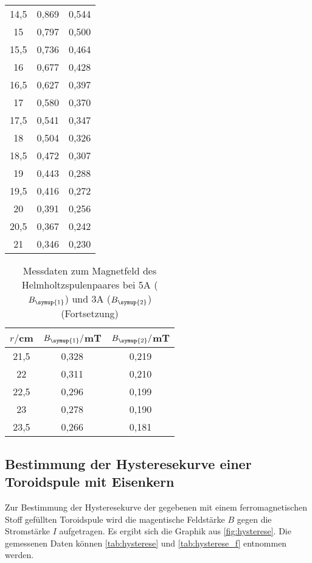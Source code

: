 \begin{table}
\begin{tabular}{c c c}
    14,5	&  0,869 & 0,544\\
    15	  &  0,797 & 0,500\\
    15,5	&  0,736 & 0,464\\
    16	  &  0,677 & 0,428\\
    16,5	&  0,627 & 0,397\\
    17	  &  0,580 & 0,370\\
    17,5	&  0,541 & 0,347\\
    18	  &  0,504 & 0,326\\
    18,5	&  0,472 & 0,307\\
    19	  &  0,443 & 0,288\\
    19,5	&  0,416 & 0,272\\
    20	  &  0,391 & 0,256\\
    20,5	&  0,367 & 0,242\\
    21	  &  0,346 & 0,230\\
    \bottomrule
  \end{tabular}
\end{table}

\begin{table}
  \centering
  \caption{Messdaten zum Magnetfeld des Helmholtzspulenpaares bei 5A ($B_{\symup{1}}$)
  und 3A ($B_{\symup{2}}$)(Fortsetzung)}
  \label{tab:helmholtz_f}
  \begin{tabular}{c c c}
    \toprule
    $r/$cm & $B_{\symup{1}}/$mT & $B_{\symup{2}}/$mT\\
    \midrule
    21,5	&  0,328 & 0,219\\
    22	  &  0,311 & 0,210\\
    22,5	&  0,296 & 0,199\\
    23	  &  0,278 & 0,190\\
    23,5	&  0,266 & 0,181\\
    \bottomrule
  \end{tabular}
\end{table}


\newpage
\subsection{Bestimmung der Hysteresekurve einer Toroidspule mit Eisenkern}

Zur Bestimmung der Hysteresekurve der gegebenen mit einem ferromagnetischen Stoff
gefüllten Toroidspule wird die magentische Feldstärke $B$ gegen die Stromstärke
$I$ aufgetragen. Es ergibt sich die Graphik aus \ref{fig:hysterese}. Die gemessenen
Daten können \ref{tab:hysterese} und \ref{tab:hysterese_f}  entnommen werden.

